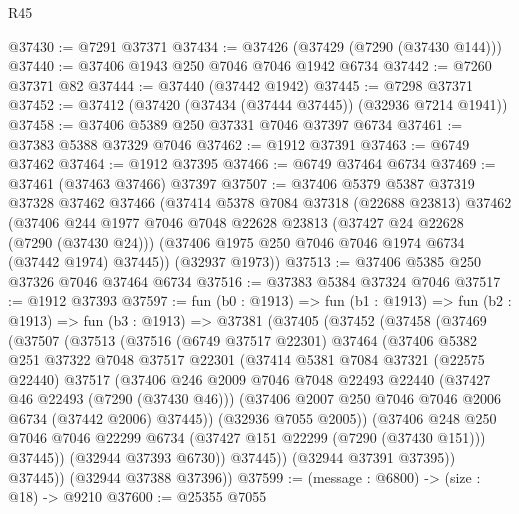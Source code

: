 \begin{lexlean}{R45}
\begin{coremodule}
{@37430 := @7291 @37371
@37434 := @37426 (@37429 (@7290 (@37430 @144)))
@37440 := @37406 @1943 @250 @7046 @7046 @1942 @6734
@37442 := @7260 @37371 @82
@37444 := @37440 (@37442 @1942)
@37445 := @7298 @37371
@37452 := @37412 (@37420 (@37434 (@37444 @37445)) (@32936 @7214 @1941))
@37458 := @37406 @5389 @250 @37331 @7046 @37397 @6734
@37461 := @37383 @5388 @37329 @7046
@37462 := @1912 @37391
@37463 := @6749 @37462
@37464 := @1912 @37395
@37466 := @6749 @37464 @6734
@37469 := @37461 (@37463 @37466) @37397
@37507 := @37406
    @5379
    @5387
    @37319
    @37328
    @37462
    @37466
    (@37414
      @5378
      @7084
      @37318
      (@22688 @23813)
      @37462
      (@37406
        @244
        @1977
        @7046
        @7048
        @22628
        @23813
        (@37427 @24 @22628 (@7290 (@37430 @24)))
        (@37406 @1975 @250 @7046 @7046 @1974 @6734 (@37442 @1974) @37445))
      (@32937 @1973))
@37513 := @37406 @5385 @250 @37326 @7046 @37464 @6734
@37516 := @37383 @5384 @37324 @7046
@37517 := @1912 @37393
@37597 := fun (b0 : @1913) =>
  fun (b1 : @1913) =>
  fun (b2 : @1913) =>
  fun (b3 : @1913) =>
  @37381
    (@37405
      (@37452
        (@37458
          (@37469
            (@37507
              (@37513
                (@37516
                  (@6749 @37517 @22301)
                  @37464
                  (@37406
                    @5382
                    @251
                    @37322
                    @7048
                    @37517
                    @22301
                    (@37414
                      @5381
                      @7084
                      @37321
                      (@22575 @22440)
                      @37517
                      (@37406
                        @246
                        @2009
                        @7046
                        @7048
                        @22493
                        @22440
                        (@37427 @46 @22493 (@7290 (@37430 @46)))
                        (@37406 @2007 @250 @7046 @7046 @2006 @6734 (@37442 @2006) @37445))
                      (@32936 @7055 @2005))
                    (@37406
                      @248
                      @250
                      @7046
                      @7046
                      @22299
                      @6734
                      (@37427 @151 @22299 (@7290 (@37430 @151)))
                      @37445))
                  (@32944 @37393 @6730))
                @37445))
            (@32944 @37391 @37395))
          @37445))
      (@32944 @37388 @37396))
@37599 := (message : @6800) -> (size : @18) -> @9210
@37600 := @25355 @7055
}
\end{coremodule}
\end{lexlean}
